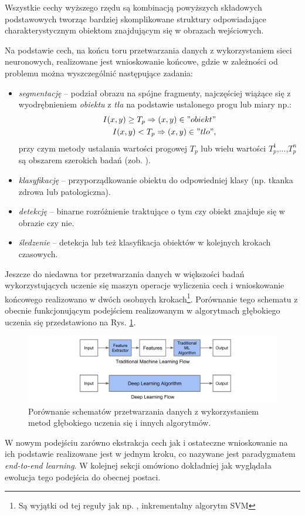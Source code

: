 Wszystkie cechy wyższego rzędu są kombinacją powyższych składowych podstawowych tworząc bardziej skomplikowane struktury odpowiadające charakterystycznym obiektom znajdującym się w obrazach wejściowych. 

Na podstawie cech, na końcu toru przetwarzania danych z wykorzystaniem sieci neuronowych, realizowane jest wnioskowanie końcowe, gdzie w zależności od problemu można wyszczególnić następujące zadania:
\begin{itemize}
	\item \textit{segmentację} -- podział obrazu na spójne fragmenty, najczęściej wiążące się z wyodrębnieniem \textit{obiektu} z \textit{tła} na podstawie ustalonego progu lub miary np.:
	\begin{equation*}
	\begin{aligned}
	I(x,y) \geq T_p \Rightarrow (x,y) \in "obiekt" \\
	I(x,y) < T_p \Rightarrow (x,y) \in "tlo",
	\end{aligned}
	\end{equation*} 
	przy czym metody ustalania wartości progowej $T_p$ lub wielu wartości {$T_p^1$,...,$T_p^n$} są obszarem szerokich badań (zob. \cite{DBLP:journals/corr/abs-1005-4020}).
	\item \textit{klasyfikację} -- przyporządkowanie obiektu do odpowiedniej klasy (np. tkanka zdrowa lub patologiczna).
	\item \textit{detekcję} -- binarne rozróżnienie traktujące o tym czy obiekt znajduje się w obrazie czy nie.
	\item \textit{śledzenie} -- detekcja lub też klasyfikacja obiektów w kolejnych krokach czasowych.
\end{itemize} 

Jeszcze do niedawna tor przetwarzania danych w większości badań wykorzystujących uczenie się maszyn operacje wyliczenia cech i wnioskowanie końcowego realizowano w dwóch osobnych krokach\footnote{Są wyjątki od tej reguły jak np. \cite{10.1007/978-3-319-58667-0_7}, inkrementalny algorytm SVM}. Porównanie tego schematu z obecnie funkcjonującym podejściem realizowanym w algorytmach głębokiego uczenia się przedstawiono na Rys. \ref{DLworkflow}.
\begin{figure}[h!]
	\centering
	\includegraphics[width=1\textwidth]{figures/DLworkflow.png}
	\caption{Porównanie schematów przetwarzania danych z wykorzystaniem metod głębokiego uczenia się i innych algorytmów.}
	\label{DLworkflow}
\end{figure}
W nowym podejściu zarówno ekstrakcja cech jak i ostateczne wnioskowanie na ich podstawie realizowane jest w jednym kroku, co nazywane jest paradygmatem \textit{end-to-end learning}. W kolejnej sekcji omówiono dokładniej jak wyglądała ewolucja tego podejścia do obecnej postaci. 

